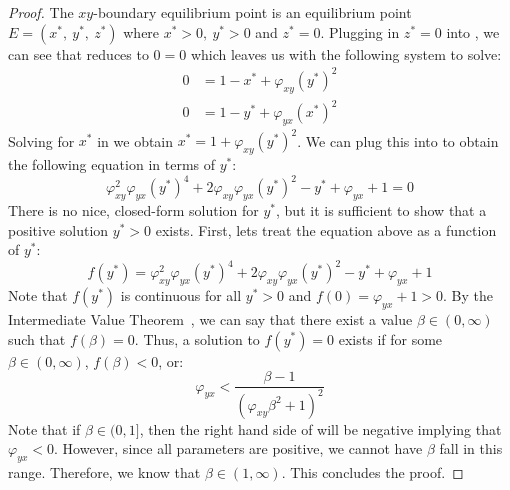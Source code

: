 \begin{proof}
    The $xy$-boundary equilibrium point is an equilibrium point $E=\left(x^*,\ y^*,\ z^*\right)$ where $x^*>0,\ y^*>0$ and $z^*=0$.
    Plugging in $z^*=0$ into , we can see that  reduces to $0=0$ which leaves us with the following system to solve:
    \begin{subequations}\label{system:xy-boundary}
        \begin{align}
            0 &= 1-x^*+\varphi_{xy}\left(y^*\right)^2 \label{eq:xy-boundary-x}\\
            0 &= 1-y^*+\varphi_{yx}\left(x^*\right)^2 \label{eq:xy-boundary-y}
        \end{align}
    \end{subequations}
    Solving for $x^*$ in  we obtain $x^*=1+\varphi_{xy}\left(y^*\right)^2$.
    We can plug this into  to obtain the following equation in terms of $y^*$:
    \begin{equation*}
        \varphi_{xy}^2\varphi_{yx}\left(y^*\right)^4+2\varphi_{xy}\varphi_{yx}\left(y^*\right)^2-y^*+\varphi_{yx}+1=0
    \end{equation*}
    There is no nice, closed-form solution for $y^*$, but it is sufficient to show that a positive solution $y^*>0$ exists.
    First, lets treat the equation above as a function of $y^*$:
    \begin{equation*}
        f\left(y^*\right)=\varphi_{xy}^2\varphi_{yx}\left(y^*\right)^4+2\varphi_{xy}\varphi_{yx}\left(y^*\right)^2-y^*+\varphi_{yx}+1
    \end{equation*}
    Note that $f\left(y^*\right)$ is continuous for all $y^*>0$ and $f(0)=\varphi_{yx}+1>0$.
    By the Intermediate Value Theorem~\cite{STEWART9781337613927}, we can say that there exist a value $\beta\in\left(0,\infty\right)$ such that $f(\beta)=0$.
    Thus, a solution to $f\left(y^*\right)=0$ exists if for some $\beta\in\left(0,\infty\right)$, $f\left(\beta\right)<0$, or:
    \begin{equation}\label{eq:xy-eq-condition}
        \varphi_{yx}<\frac{\beta-1}{\left(\varphi_{xy}\beta^2+1\right)^2}
    \end{equation}
    Note that if $\beta\in(0, 1]$, then the right hand side of  will be negative implying that $\varphi_{yx}<0$.
    However, since all parameters are positive, we cannot have $\beta$ fall in this range.
    Therefore, we know that $\beta\in\left(1,\infty\right)$.
    This concludes the proof.
\end{proof}
